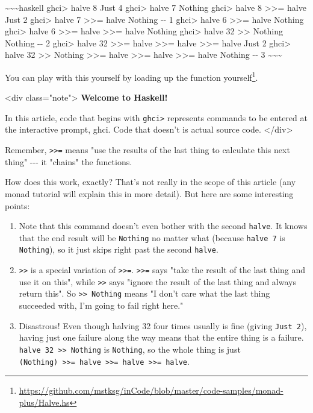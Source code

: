 \documentclass[]{article}
\renewcommand{\href}[2]{#2\footnote{\url{#1}}}
\begin{document}
\textasciitilde{}\textasciitilde{}\textasciitilde{}haskell ghci\textgreater{}
halve 8 Just 4 ghci\textgreater{} halve 7 Nothing ghci\textgreater{} halve 8
\textgreater{}\textgreater{}= halve Just 2 ghci\textgreater{} halve 7
\textgreater{}\textgreater{}= halve Nothing -\/- 1 ghci\textgreater{} halve 6
\textgreater{}\textgreater{}= halve Nothing ghci\textgreater{} halve 6
\textgreater{}\textgreater{}= halve \textgreater{}\textgreater{}= halve Nothing
ghci\textgreater{} halve 32 \textgreater{}\textgreater{} Nothing Nothing -\/- 2
ghci\textgreater{} halve 32 \textgreater{}\textgreater{}= halve
\textgreater{}\textgreater{}= halve \textgreater{}\textgreater{}= halve Just 2
ghci\textgreater{} halve 32 \textgreater{}\textgreater{} Nothing
\textgreater{}\textgreater{}= halve \textgreater{}\textgreater{}= halve
\textgreater{}\textgreater{}= halve Nothing -\/- 3
\textasciitilde{}\textasciitilde{}\textasciitilde{}

You can play with this yourself by
\href{https://github.com/mstksg/inCode/blob/master/code-samples/monad-plus/Halve.hs}{loading
up the function yourself}.

\textless{}div class="note"\textgreater{} \textbf{Welcome to Haskell!}

In this article, code that begins with \texttt{ghci\textgreater{}} represents
commands to be entered at the interactive prompt, ghci. Code that doesn't is
actual source code. \textless{}/div\textgreater{}

Remember, \texttt{\textgreater{}\textgreater{}=} means "use the results of the
last thing to calculate this next thing" -\/-\/- it "chains" the functions.

How does this work, exactly? That's not really in the scope of this article (any
monad tutorial will explain this in more detail). But here are some interesting
points:

\begin{enumerate}
\tightlist
\item
  Note that this command doesn't even bother with the second \texttt{halve}. It
  knows that the end result will be \texttt{Nothing} no matter what (because
  \texttt{halve\ 7} is \texttt{Nothing}), so it just skips right past the second
  \texttt{halve}.
\item
  \texttt{\textgreater{}\textgreater{}} is a special variation of
  \texttt{\textgreater{}\textgreater{}=}. \texttt{\textgreater{}\textgreater{}=}
  says "take the result of the last thing and use it on this", while
  \texttt{\textgreater{}\textgreater{}} says "ignore the result of the last
  thing and always return this". So
  \texttt{\textgreater{}\textgreater{}\ Nothing} means "I don't care what the
  last thing succeeded with, I'm going to fail right here."
\item
  Disastrous! Even though halving 32 four times usually is fine (giving
  \texttt{Just\ 2}), having just one failure along the way means that the entire
  thing is a failure. \texttt{halve\ 32\ \textgreater{}\textgreater{}\ Nothing}
  is \texttt{Nothing}, so the whole thing is just
  \texttt{(Nothing)\ \textgreater{}\textgreater{}=\ halve\ \textgreater{}\textgreater{}=\ halve\ \textgreater{}\textgreater{}=\ halve}.
\end{enumerate}
\end{document}
